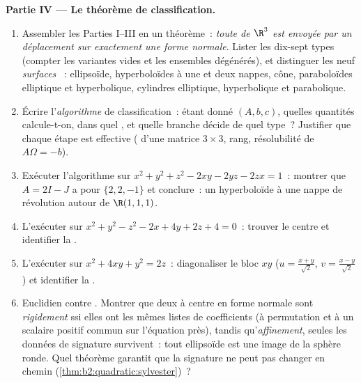 \begin{problem}
\medskip
\noindent\textbf{Partie IV --- Le théorème de classification.}
\begin{enumerate}[resume]
  \item Assembler les Parties I--III en un théorème~: \emph{toute
         de $\R^3$ est envoyée par un déplacement sur
        exactement une forme normale}. Lister les dix-sept types
         (compter les variantes vides et les ensembles
        dégénérés), et distinguer les neuf \emph{surfaces}
        ~: ellipsoïde, hyperboloïdes à une et deux
        nappes, cône, paraboloïdes elliptique et hyperbolique,
        cylindres elliptique, hyperbolique et parabolique.
  \item Écrire l'\emph{algorithme} de classification~: étant
        donné $(A, b, c)$, quelles quantités calcule-t-on, dans
        quel , et quelle branche décide de quel type~?
        Justifier que chaque étape est effective (
        d'une matrice  $3\times3$, rang, résolubilité de
        $A\Omega = -b$).
  \item Exécuter l'algorithme sur $x^2 + y^2 + z^2 - 2xy - 2yz -
        2zx = 1$~: montrer que $A = 2I - J$ a pour  $\{2, 2,
        -1\}$ et conclure~: un hyperboloïde à une nappe de
        révolution autour de $\R(1,1,1)$.
  \item L'exécuter sur $x^2 + y^2 - z^2 - 2x + 4y + 2z + 4 = 0$~:
        trouver le centre et identifier la .
  \item L'exécuter sur $x^2 + 4xy + y^2 = 2z$~: diagonaliser le
        bloc $xy$ ($u = \frac{x+y}{\sqrt2}$, $v =
        \frac{x-y}{\sqrt2}$) et identifier la .
  \item Euclidien contre . Montrer que deux  à
        centre en forme normale sont \emph{rigidement} 
        ssi elles ont les mêmes listes de coefficients (à
        permutation et à un scalaire positif commun sur l'équation
        près), tandis qu'\emph{affinement}, seules les données de
        signature survivent~: tout ellipsoïde est une image 
        de la sphère ronde. Quel théorème garantit que la
        signature ne peut pas changer en chemin
        (\cref{thm:b2:quadratic:sylvester})~?
\end{enumerate}


\end{problem}
